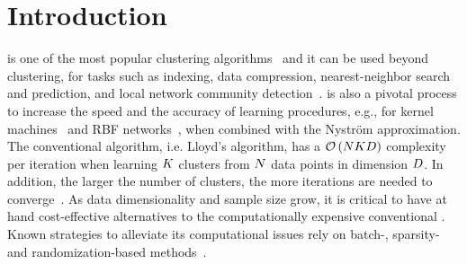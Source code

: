 \section{Introduction}

\kmeans is one of the most popular clustering algorithms~\cite{hartigan1979algorithm,jain2010data} and it can be used beyond clustering, for tasks such as indexing, data compression,  nearest-neighbor search and prediction, and local network community detection~\cite{muja2014scalable,van2016local}.
\kmeans is also a pivotal process to increase the speed and the accuracy of learning procedures, e.g., for kernel machines~\cite{si2016computationally} and RBF networks~\cite{que2016back}, when combined with the Nyström approximation.
%
The  conventional  \kmeans  algorithm, i.e.  Lloyd's algorithm, has  a $\mathcal{O}\left(NKD\right)$  complexity  per iteration when learning $K$ clusters from $N$ data points in dimension $D$.
In addition, the larger the number of clusters, the more iterations are needed to converge~\cite{arthur2006slow}.
%
As data dimensionality and sample size grow, it is critical to have at hand cost-effective 
alternatives to the computationally expensive conventional \kmeans. 
Known strategies to alleviate its computational issues rely on batch-, sparsity- and randomization-based methods~\cite{Sculley2010Web,boutsidis2014randomized,shen2017compressed,liu2017sparse}.

